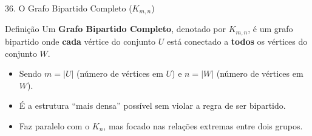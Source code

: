 \documentclass[9pt]{beamer}
\begin{document}
    \begin{frame}{36. O Grafo Bipartido Completo ($K_{m,n}$)}
        \begin{block}{Definição}
            Um \textbf{Grafo Bipartido Completo}, denotado por $K_{m,n}$, é um grafo bipartido onde \textbf{cada} vértice do conjunto $U$ está conectado a \textbf{todos} os vértices do conjunto $W$.
        \end{block}
        \vspace{0.3cm}
        \begin{itemize}
            \item Sendo $m = |U|$ (número de vértices em $U$) e $n = |W|$ (número de vértices em $W$).
            \item É a estrutura ``mais densa'' possível sem violar a regra de ser bipartido.
            \item Faz paralelo com o $K_n$, mas focado nas relações extremas entre dois grupos.
        \end{itemize}
    \end{frame}
\end{document}
